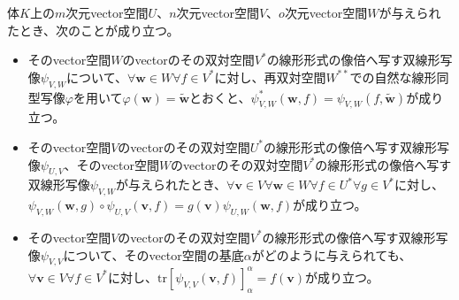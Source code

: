 \documentclass[dvipdfmx]{jsarticle}
\begin{document}
\begin{thm}\label{2.4.5.8}
体$K$上の$m$次元vector空間$U$、$n$次元vector空間$V$、$o$次元vector空間$W$が与えられたとき、次のことが成り立つ。
\begin{itemize}
\item
  そのvector空間$W$のvectorのその双対空間$V^{*}$の線形形式の像倍へ写す双線形写像$\psi_{V,W}$について、$\forall\mathbf{w} \in W\forall f \in V^{*}$に対し、再双対空間$W^{**}$での自然な線形同型写像$\varphi$を用いて$\varphi\left( \mathbf{w} \right) = \widetilde{\mathbf{w}}$とおくと、$\psi_{V,W}^{*}\left( \mathbf{w},f \right) = \psi_{V,W}\left( f,\widetilde{\mathbf{w}} \right)$が成り立つ。
\item
  そのvector空間$V$のvectorのその双対空間$U^{*}$の線形形式の像倍へ写す双線形写像$\psi_{U,V}$、そのvector空間$W$のvectorのその双対空間$V^{*}$の線形形式の像倍へ写す双線形写像$\psi_{V,W}$が与えられたとき、$\forall\mathbf{v} \in V\forall\mathbf{w} \in W\forall f \in U^{*}\forall g \in V^{*}$に対し、$\psi_{V,W}\left( \mathbf{w},g \right) \circ \psi_{U,V}\left( \mathbf{v},f \right) = g\left( \mathbf{v} \right)\psi_{U,W}\left( \mathbf{w},f \right)$が成り立つ。
\item
  そのvector空間$V$のvectorのその双対空間$V^{*}$の線形形式の像倍へ写す双線形写像$\psi_{V,V}$について、そのvector空間の基底$\alpha$がどのように与えられても、$\forall\mathbf{v} \in V\forall f \in V^{*}$に対し、$\mathrm{tr}\left[ \psi_{V,V}\left( \mathbf{v},f \right) \right]_{\alpha}^{\alpha} = f\left( \mathbf{v} \right)$が成り立つ。
\end{itemize}
\end{thm}
\end{document}
